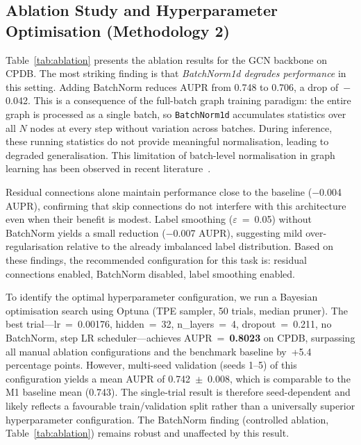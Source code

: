\subsection{Ablation Study and Hyperparameter Optimisation (Methodology 2)}
\label{sec:ablation}

Table~\ref{tab:ablation} presents the ablation results for the GCN backbone on CPDB.
The most striking finding is that \emph{BatchNorm1d degrades performance} in this setting.
Adding BatchNorm reduces AUPR from 0.748 to 0.706, a drop of~$-$0.042. This is a consequence
of the full-batch graph training paradigm: the entire graph is processed as a single batch,
so \texttt{BatchNorm1d} accumulates statistics over all $N$ nodes at every step without
variation across batches. During inference, these running statistics do not provide meaningful
normalisation, leading to degraded generalisation. This limitation of batch-level normalisation
in graph learning has been observed in recent literature~\cite{graphnorm2021}.

Residual connections alone maintain performance close to the baseline ($-$0.004 AUPR),
confirming that skip connections do not interfere with this architecture even when their
benefit is modest. Label smoothing ($\varepsilon$~=~0.05) without BatchNorm yields a small
reduction ($-$0.007 AUPR), suggesting mild over-regularisation relative to the already
imbalanced label distribution. Based on these findings, the recommended configuration for
this task is: residual connections enabled, BatchNorm disabled, label smoothing enabled.

To identify the optimal hyperparameter configuration, we run a Bayesian optimisation search
using Optuna (TPE sampler, 50 trials, median pruner). The best trial---lr~=~0.00176,
hidden~=~32, n\_layers~=~4, dropout~=~0.211, no BatchNorm, step LR scheduler---achieves
AUPR~=~\textbf{0.8023} on CPDB, surpassing all manual ablation configurations and the
benchmark baseline by~+5.4 percentage points. However, multi-seed validation (seeds
1--5) of this configuration yields a mean AUPR of 0.742~$\pm$~0.008, which is comparable
to the M1 baseline mean (0.743). The single-trial result is therefore seed-dependent and
likely reflects a favourable train/validation split rather than a universally superior
hyperparameter configuration. The BatchNorm finding (controlled ablation, Table~\ref{tab:ablation})
remains robust and unaffected by this result.

